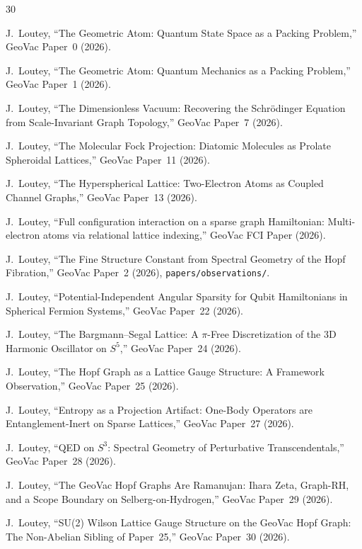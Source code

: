 \documentclass[aps,pra,twocolumn,superscriptaddress,longbibliography]{revtex4-2}
\begin{document}
\begin{thebibliography}{30}

J.~Loutey,
``The Geometric Atom: Quantum State Space as a Packing Problem,''
GeoVac Paper~0 (2026).

J.~Loutey,
``The Geometric Atom: Quantum Mechanics as a Packing Problem,''
GeoVac Paper~1 (2026).

J.~Loutey,
``The Dimensionless Vacuum: Recovering the Schr\"odinger Equation
from Scale-Invariant Graph Topology,''
GeoVac Paper~7 (2026).

J.~Loutey,
``The Molecular Fock Projection: Diatomic Molecules as Prolate
Spheroidal Lattices,''
GeoVac Paper~11 (2026).

J.~Loutey,
``The Hyperspherical Lattice: Two-Electron Atoms as Coupled
Channel Graphs,''
GeoVac Paper~13 (2026).

J.~Loutey,
``Full configuration interaction on a sparse graph Hamiltonian:
Multi-electron atoms via relational lattice indexing,''
GeoVac FCI Paper (2026).

J.~Loutey,
``The Fine Structure Constant from Spectral Geometry of the Hopf
Fibration,''
GeoVac Paper~2 (2026), \texttt{papers/observations/}.

J.~Loutey,
``Potential-Independent Angular Sparsity for Qubit Hamiltonians in
Spherical Fermion Systems,''
GeoVac Paper~22 (2026).

J.~Loutey,
``The Bargmann--Segal Lattice: A $\pi$-Free Discretization of the
3D Harmonic Oscillator on $S^5$,''
GeoVac Paper~24 (2026).

J.~Loutey,
``The Hopf Graph as a Lattice Gauge Structure: A Framework Observation,''
GeoVac Paper~25 (2026).

J.~Loutey,
``Entropy as a Projection Artifact: One-Body Operators are
Entanglement-Inert on Sparse Lattices,''
GeoVac Paper~27 (2026).

J.~Loutey,
``QED on $S^3$: Spectral Geometry of Perturbative Transcendentals,''
GeoVac Paper~28 (2026).

J.~Loutey,
``The GeoVac Hopf Graphs Are Ramanujan: Ihara Zeta, Graph-RH, and
a Scope Boundary on Selberg-on-Hydrogen,''
GeoVac Paper~29 (2026).

J.~Loutey,
``SU(2) Wilson Lattice Gauge Structure on the GeoVac Hopf Graph:
The Non-Abelian Sibling of Paper~25,''
GeoVac Paper~30 (2026).


\end{thebibliography}
\end{document}
